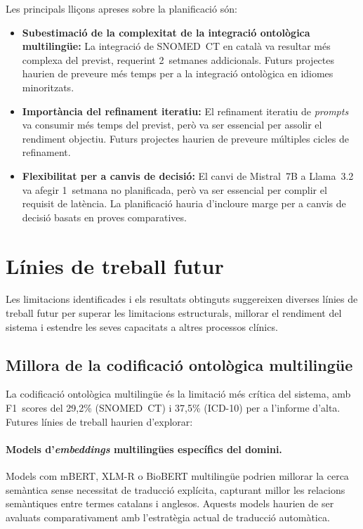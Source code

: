 \documentclass[CAT]{TFUOC}%
\begin{document}
Les principals lliçons apreses sobre la planificació són:

\begin{itemize}
    \item \textbf{Subestimació de la complexitat de la integració ontològica multilingüe:} La integració de SNOMED~CT en català va resultar més complexa del previst, requerint 2~setmanes addicionals. Futurs projectes haurien de preveure més temps per a la integració ontològica en idiomes minoritzats.
    
    \item \textbf{Importància del refinament iteratiu:} El refinament iteratiu de \textit{prompts} va consumir més temps del previst, però va ser essencial per assolir el rendiment objectiu. Futurs projectes haurien de preveure múltiples cicles de refinament.
    
    \item \textbf{Flexibilitat per a canvis de decisió:} El canvi de Mistral~7B a Llama~3.2 va afegir 1~setmana no planificada, però va ser essencial per complir el requisit de latència. La planificació hauria d'incloure marge per a canvis de decisió basats en proves comparatives.
\end{itemize}

\section{Línies de treball futur}

Les limitacions identificades i els resultats obtinguts suggereixen diverses línies de treball futur per superar les limitacions estructurals, millorar el rendiment del sistema i estendre les seves capacitats a altres processos clínics.

\subsection{Millora de la codificació ontològica multilingüe}

La codificació ontològica multilingüe és la limitació més crítica del sistema, amb F1~scores del 29,2\% (SNOMED~CT) i 37,5\% (ICD-10) per a l'informe d'alta. Futures línies de treball haurien d'explorar:

\paragraph{Models d'\textit{embeddings} multilingües específics del domini.}
Models com mBERT, XLM-R o BioBERT multilingüe podrien millorar la cerca semàntica sense necessitat de traducció explícita, capturant millor les relacions semàntiques entre termes catalans i anglesos. Aquests models haurien de ser avaluats comparativament amb l'estratègia actual de traducció automàtica.
\end{document}
